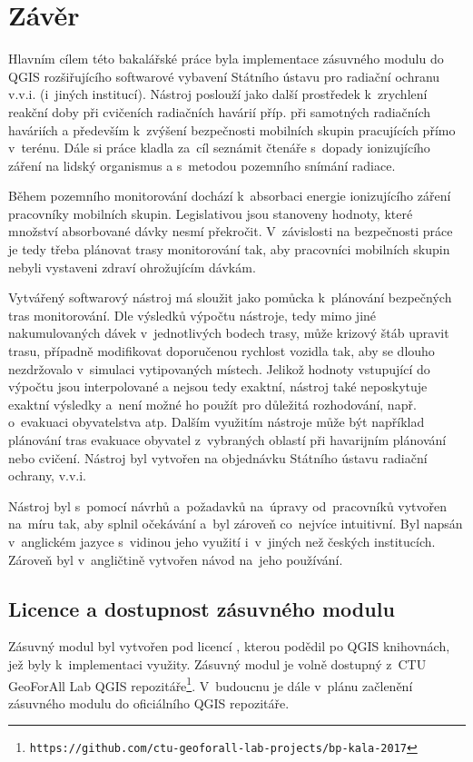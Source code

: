 \chapter{Závěr}
\label{5-zaver}

Hlavním cílem této bakalářské práce byla implementace zásuvného modulu
do QGIS rozšiřujícího softwarové vybavení Státního ústavu pro radiační
ochranu v.v.i. (i~jiných institucí). Nástroj poslouží jako další
prostředek k~zrychlení reakční doby při cvičeních radiačních havárií
příp. při samotných radiačních haváriích a především k~zvýšení
bezpečnosti mobilních skupin pracujících přímo v~terénu. Dále si práce
kladla za~cíl seznámit čtenáře s~dopady ionizujícího záření na lidský
organismus a s~metodou pozemního snímání radiace.

Během pozemního monitorování dochází
k~absorbaci energie ionizujícího záření pracovníky mobilních skupin. 
Legislativou jsou
stanoveny hodnoty, které množství absorbované dávky nesmí
překročit. V~závislosti na bezpečnosti práce je tedy třeba plánovat
trasy monitorování tak, aby pracovníci mobilních skupin nebyli vystaveni zdraví
ohrožujícím dávkám.

Vytvářený softwarový nástroj má sloužit jako pomůcka k~plánování bezpečných tras
monitorování. Dle výsledků výpočtu nástroje, tedy mimo jiné
nakumulovaných dávek v~jednotlivých bodech trasy, může krizový štáb
upravit trasu, případně mo\-difikovat doporučenou rychlost vozidla tak,
aby se dlouho nezdržovalo v~simulaci vytipovaných 
místech. Jelikož hodnoty vstupující do výpočtu jsou interpolované a
nejsou tedy exaktní, nástroj také neposkytuje exaktní výsledky a~není
možné ho použít pro důležitá rozhodování, např. o~evakuaci
obyvatelstva atp. Dalším využitím nástroje může být například
plánování tras evakuace obyvatel z~vybraných oblastí při havarijním
plánování nebo cvičení. Nástroj byl vytvořen na objednávku Státního
ústavu radiační ochrany, v.v.i.

Nástroj byl s~pomocí návrhů a~požadavků na~úpravy od~pracovníků
 vytvořen na~míru tak, aby splnil očekávání a~byl zároveň 
co~nejvíce intuitivní. Byl napsán v~anglickém jazyce s~vidinou
jeho využití i~v~jiných než českých institucích. Zároveň byl
v~angličtině vytvořen návod na~jeho používání.

\section{Licence a dostupnost zásuvného modulu} Zásuvný modul byl
vytvořen pod licencí , kterou podědil po QGIS knihovnách,
jež byly k~implementaci využity. Zásuvný modul je volně dostupný z~CTU
GeoForAll Lab QGIS
repozitáře\footnote{\texttt{https://github.com/ctu-geoforall-lab-projects/bp-kala-2017}}. V~budoucnu
je dále v~plánu začlenění zásuvného modulu do oficiálního QGIS
repozitáře.

 



